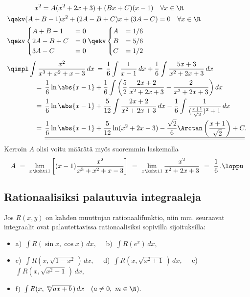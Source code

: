 \begin{align*}
&\qquad\qquad x^2= A(x^2+2x+3)+(Bx+C)(x-1)\quad\forall x\in\R \\
&\qekv       (A+B-1)x^2+(2A-B+C)x+(3A-C)=0\quad\forall x\in\R \\
&\qekv       \begin{cases} A+B-1 &= 0 \\ 2A-B+C &= 0 \\ 3A-C &= 0 \end{cases} 
             \qekv \begin{cases} A &= 1/6 \\ B &= 5/6 \\ C &= 1/2 \end{cases} \\[1mm]
&\qimpl\int\frac{x^2}{x^3+x^2+x-3}\,dx \,=\, 
                \frac{1}{6}\int\frac{1}{x-1}\, dx+\frac{1}{6}\int\frac{5x+3}{x^2+2x+3}\, dx \\
&\qquad\qquad=\,\frac{1}{6}\ln\abs{x-1}+\frac{1}{6}\int\left(
                \frac{5}{2}\,\frac{2x+2}{x^2+2x+3}-\frac{2}{x^2+2x+3}\right)dx \\
&\qquad\qquad=\,\frac{1}{6}\ln\abs{x-1}+\frac{5}{12}\int\frac{2x+2}{x^2+2x+3}\,dx
               -\frac{1}{6}\int\frac{1}{(\frac{x+1}{\sqrt{2}})^2+1}\,dx \\
&\qquad\qquad=\,\underline{\underline{\frac{1}{6}\ln\abs{x-1}+\frac{5}{12}\ln(x^2+2x+3)
                            -\frac{\sqrt{2}}{6}\Arctan\left(\frac{x+1}{\sqrt{2}}\right)+C}}.
\end{align*}
Kerroin $A$ olisi voitu määrätä myös suoremmin laskemalla
\[
A\ =\ \lim_{x\kohti 1}\left[(x-1)\frac{x^2}{x^3+x^2+x-3}\right]\ 
   =\ \lim_{x\kohti 1}\frac{x^2}{x^2+2x+3}\ =\ \frac{1}{6}\,. \loppu
\]

\subsection*{Rationaalisiksi palautuvia integraaleja}

Jos $R(x,y)$ on kahden muuttujan rationaalifunktio, niin mm. seuraavat integraalit ovat
palautettavissa rationaalisiksi sopivilla sijoituksilla:
\begin{itemize}
\item[] a)\ $\int R(\sin x,\cos x)\,dx, \quad$ b)\ $\int R(e^x)\,dx$,
\item[] c)\ $\int R(x,\sqrt{1-x^2}\,)\,dx, \quad$ d)\ $\int R(x,\sqrt{x^2+1}\,)\,dx, \quad$
        e)\ $\int R(x,\sqrt{x^2-1}\,)\,dx$,
\item[] f)\ $\int R(x,\sqrt[m]{ax+b}\,)\,dx \quad (a\neq 0,\ m \in \N).$
\end{itemize}

